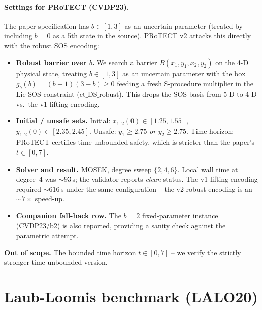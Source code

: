 \documentclass[11pt,a4paper]{article}
\newcommand{\settings}[1]{\paragraph{Settings for PRoTECT (#1).}}
\begin{document}
\settings{CVDP23}
The paper specification has $b \in [1, 3]$ as an uncertain parameter
(treated by including $\dot b = 0$ as a 5th state in the source). PRoTECT
v2 attacks this directly with the robust SOS encoding:
\begin{itemize}
  \item \textbf{Robust barrier over $b$.} We search a barrier
        $B(x_1, y_1, x_2, y_2)$ on the 4-D physical state, treating
        $b \in [1, 3]$ as an uncertain parameter with the box
        $g_b(b) = (b - 1)(3 - b) \ge 0$ feeding a fresh
        S-procedure multiplier in the Lie SOS constraint
        ($\mathrm{ct\_DS\_robust}$). This drops the SOS basis from 5-D
        to 4-D vs.\ the v1 lifting encoding.
  \item \textbf{Initial / unsafe sets.} Initial:
        $x_{1,2}(0) \in [1.25, 1.55]$,
        $y_{1,2}(0) \in [2.35, 2.45]$.
        Unsafe: $y_1 \ge 2.75$ \emph{or} $y_2 \ge 2.75$.
        Time horizon: PRoTECT certifies time-unbounded safety, which is
        stricter than the paper's $t \in [0, 7]$.
  \item \textbf{Solver and result.} MOSEK, degree sweep $\{2, 4, 6\}$.
        Local wall time at degree~4 was $\sim 93\,$s; the validator
        reports \emph{clean} status. The v1 lifting encoding required
        ${\sim}616\,$s under the same configuration -- the v2 robust
        encoding is an $\sim 7\times$ speed-up.
  \item \textbf{Companion fall-back row.} The $b = 2$ fixed-parameter
        instance (CVDP23/b2) is also reported, providing a sanity
        check against the parametric attempt.
\end{itemize}
\textbf{Out of scope.} The bounded time horizon $t \in [0, 7]$ -- we
verify the strictly stronger time-unbounded version.

\section{Laub-Loomis benchmark (LALO20)}
\end{document}
